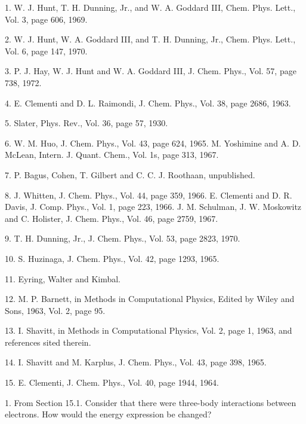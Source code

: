 
\item{1.} W. J. Hunt, T. H. Dunning, Jr., and W. A. Goddard III, Chem. Phys.
Lett., Vol. 3, page 606, 1969.

\item{2.} W. J. Hunt, W. A. Goddard III, and T. H. Dunning, Jr., Chem. Phys.
Lett., Vol. 6, page 147, 1970.

\item{3.} P. J. Hay, W. J. Hunt and W. A. Goddard III, J. Chem. Phys., Vol.
57, page 738, 1972.

\item{4.} E. Clementi and D. L. Raimondi, J. Chem. Phys., Vol. 38, page 2686,
1963.

\item{5.} Slater, Phys. Rev., Vol. 36, page 57, 1930.

\item{6.} W. M. Huo, J. Chem. Phys., Vol. 43, page 624, 1965.  M. Yoshimine
and A. D. McLean, Intern. J. Quant. Chem., Vol. 1s, page 313, 1967.

\item{7.} P. Bagus, Cohen, T. Gilbert and C. C. J. Roothaan, unpublished.

\item{8.} J. Whitten, J. Chem. Phys., Vol. 44, page 359, 1966.  E. Clementi and
D. R. Davis, J. Comp. Phys., Vol. 1, page 223, 1966.  J. M. Schulman,
J. W. Moskowitz and C. Holister, J. Chem. Phys., Vol. 46, page 2759,
1967.

\item{9.} T. H. Dunning, Jr., J. Chem. Phys., Vol. 53, page 2823, 1970.

\item{10.} S. Huzinaga, J. Chem. Phys., Vol. 42, page 1293, 1965.

\item{11.} Eyring, Walter and Kimbal.

\item{12.} M. P. Barnett, in Methods in Computational Physics, Edited by Wiley
and Sons, 1963, Vol. 2, page 95.

\item{13.} I. Shavitt, in Methods in Computational Physics, Vol. 2, page 
1, 1963, and references sited therein.

\item{14.} I. Shavitt and M. Karplus, J. Chem. Phys., Vol. 43, page 398, 1965.

\item{15.} E. Clementi, J. Chem. Phys., Vol. 40, page 1944, 1964.

\bigskip


\item{1.} From Section 15.1. Consider that there were three-body interactions
between electrons. How would the energy expression be changed?

\bigskip

